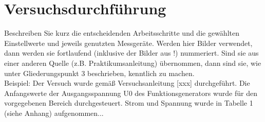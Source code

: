\section{Versuchsdurchführung}
Beschreiben Sie kurz die entscheidenden Arbeitsschritte und die gewählten Einstellwerte und jeweils genutzten Messgeräte. Werden hier Bilder verwendet, dann werden sie fortlaufend (inklusive der Bilder aus !) nummeriert. Sind sie aus einer anderen Quelle (z.B. Praktikumsanleitung) übernommen, dann sind sie, wie unter Gliederungspunkt 3 beschrieben, kenntlich zu machen.\\

Beispiel: \glqq Der Versuch wurde gemäß Versuchsanleitung [xxx] durchgeführt. Die Anfangswerte der Ausgangsspannung U0 des Funktionsgenerators wurde für den vorgegebenen Bereich durchgesteuert. Strom und Spannung wurde in Tabelle 1 (siehe Anhang) aufgenommen...\grqq{}
